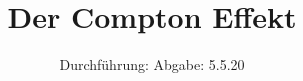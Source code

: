 

\subject{V603}
\title{Der Compton Effekt}
\date{%
  Durchführung: 
  \hspace{3em}
  Abgabe: 5.5.20
}



\maketitle
\thispagestyle{empty}
\tableofcontents
\newpage







\printbibliography{}


